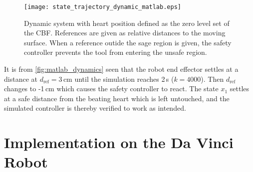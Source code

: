 \vspace{-2mm}
\begin{figure}[H]
	\center
		\texttt{[image: state\_trajectory\_dynamic\_matlab.eps]}
	\caption{Dynamic system with heart position defined as the zero level set of the CBF. References are given as relative distances to the moving surface. When a reference outide the sage region is given, the safety controller prevents the tool from entering the unsafe region.}
    \label{fig:matlab_dynamics}
\end{figure}
It is from \autoref{fig:matlab_dynamics} seen that the robot end effector settles at a distance at $d_\text{ref}=3\,$cm until the simulation reaches 2\,s ($k=4000$). Then $d_\text{ref}$ changes to -1\,cm which causes the safety controller to react. The state $x_1$ settles at a safe distance from the beating heart which is left untouched, and the simulated controller is thereby verified to work as intended.

\section{Implementation on the Da Vinci Robot}

